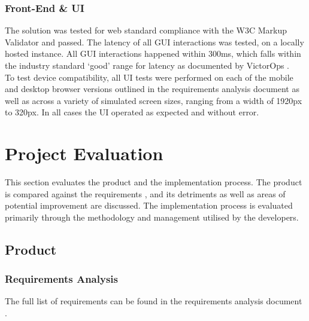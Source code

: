 \documentclass[9pt, titlepage]{extarticle}
\begin{document}
\subsubsection{Front-End \& UI}
The solution was tested for web standard compliance with the W3C Markup Validator \cite{web:w3c} and passed. The latency of all GUI interactions was tested, on a locally hosted instance. All GUI interactions happened within 300ms, which falls within the industry standard ‘good’ range for latency as documented by VictorOps \cite{victorops}.\\

To test device compatibility, all UI tests were performed on each of the mobile and desktop browser versions outlined in the requirements analysis document \cite{requirements-analysis} as well as across a variety of simulated screen sizes, ranging from a width of 1920px to 320px. In all cases the UI operated as expected and without error.

\section{Project Evaluation}

This section evaluates the product and the implementation process. The product is compared against the requirements \cite{requirements-analysis}, and its detriments as well as areas of potential improvement are discussed. The implementation process is evaluated primarily through the methodology and management utilised by the developers.

\subsection{Product}

\subsubsection{Requirements Analysis}
The full list of requirements can be found in the requirements analysis document \cite{requirements-analysis}.
\end{document}
